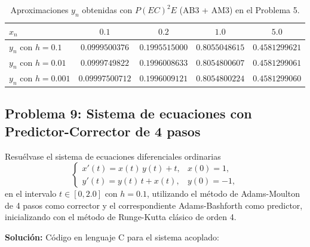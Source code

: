 \begin{table}[htbp]
    \centering
    \caption{Aproximaciones $y_n$ obtenidas con $P(EC)^2 E$ (AB3 + AM3) en el Problema 5.}
    \label{tab:prob5_pec2e}
    \renewcommand{\arraystretch}{1.25}
    \small
    \begin{tabular}{lcccc}
        \toprule
        $x_n$ & $0.1$ & $0.2$ & $1.0$ & $5.0$ \\
        \midrule
        $y_n$ con $h = 0.1$   & $0.0999500376$  & $0.1995515000$ & $0.8055048615$ & $0.4581299621$ \\
        $y_n$ con $h = 0.01$  & $0.0999749822$  & $0.1996008633$ & $0.8054800607$ & $0.4581299061$ \\
        $y_n$ con $h = 0.001$ & $0.09997500712$ & $0.1996009121$ & $0.8054800224$ & $0.4581299060$ \\
        \bottomrule
    \end{tabular}
\end{table}

\subsection*{Problema 9: Sistema de ecuaciones con Predictor-Corrector de 4 pasos}

Resuélvase el sistema de ecuaciones diferenciales ordinarias
\begin{equation*}
    \begin{cases}
        x'(t) = x(t)\,y(t) + t, & x(0) = 1, \\[0.3em]
        y'(t) = y(t)\,t + x(t), & y(0) = -1,
    \end{cases}
    \tag{3.8.7}
\end{equation*}
en el intervalo $t \in [0, 2.0]$ con $h = 0.1$, utilizando el método de Adams-Moulton de 4 pasos como corrector y el correspondiente Adams-Bashforth como predictor, inicializando con el método de Runge-Kutta clásico de orden 4.

\textbf{Solución:} Código en lenguaje C para el sistema acoplado:

